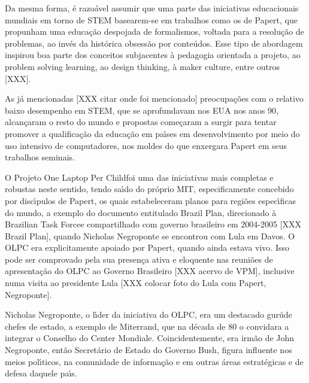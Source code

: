\documentclass[
12pt,		%
openright,	%
twoside,  %
a4paper,			%
chapter=TITLE,		%
english,			%
french,				%
spanish,			%
brazil				%
]{USPSC-classe/USPSC_RedarTex}
\begin{document}
Da mesma forma, \'e razo\'avel assumir que uma parte das iniciativas educacionais mundiais em torno de STEM basearem-se em trabalhos como os de Papert, que propunham uma educa\c{c}\~ao despojada de formalismos, voltada para a resolu\c{c}\~ao de problemas, ao inv\'es da hist\'orica obsess\~ao por conte\'udos. Esse tipo de abordagem inspirou boa parte dos conceitos subjacentes \`a \textquotedbl pedagogia orientada a projeto\textquotedbl [XXX], ao \textquotedbl problem solving learning\textquotedbl [XXX], ao \textquotedbl design thinking, \`a \textquotedbl maker culture\textquotedbl , entre outros [XXX].








As j\'a mencionadas [XXX citar onde foi mencionado] preocupa\c{c}\~oes com o relativo baixo desempenho em STEM, que se aprofundavam nos EUA nos anos 90, alcan\c{c}aram o resto do mundo e propostas come\c{c}aram a surgir para tentar promover a qualifica\c{c}\~ao da educa\c{c}\~ao em pa\'{\i}ses em desenvolvimento por meio do uso intensivo de computadores, nos moldes do que enxergara Papert em seus trabalhos seminais.








O Projeto \textquotedbl One Laptop Per Child foi uma das iniciativas mais completas e robustas neste sentido, tendo sa\'{\i}do  do pr\'oprio MIT, especificamente concebido por disc\'{\i}pulos de Papert, os quais estabeleceram planos para regi\~oes espec\'{\i}ficas do mundo, a exemplo do documento entitulado \textquotedbl Brazil Plan\textquotedbl , direcionado \`a \textquotedbl Brazilian Task Force\textquotedbl  e compartilhado com governo brasileiro em 2004-2005 [XXX Brazil Plan], quando Nicholas Negroponte se encontrou com Lula em Davos. O OLPC era explicitamente apoiado por Papert, quando ainda estava vivo. Isso pode ser comprovado pela sua presen\c{c}a ativa e eloquente nas reuni\~oes de apresenta\c{c}\~ao do OLPC ao Governo Brasileiro [XXX acervo de VPM], inclusive numa visita ao presidente Lula [XXX colocar foto do Lula com Papert, Negroponte].








Nicholas Negroponte, o l\'{\i}der da iniciativa do OLPC, era um destacado \textquotedbl gur\'u\textquotedbl  de chefes de estado, a exemplo de Miterrand, que na d\'ecada de 80 o convidara a integrar o Conselho do \textquotedbl Center Mondiale. Coincidentemente, era irm\~ao de John Negroponte, ent\~ao Secret\'ario de Estado do Governo Bush, figura influente nos meios pol\'{\i}ticos, na comunidade de informa\c{c}\~ao e em outras \'areas estrat\'egicas e de defesa daquele pa\'{\i}s.
\end{document}
